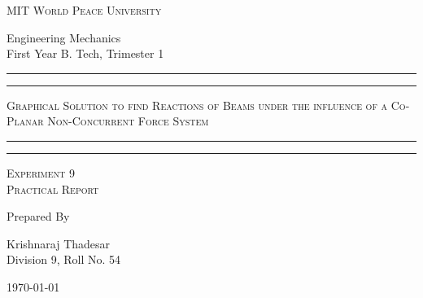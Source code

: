 \documentclass[11pt]{article}
\begin{document}
	
	\begin{titlepage} 
		\centering 
		
		
		\huge\textsc{
			MIT World Peace University
		}\\
	
		\vspace{0.75\baselineskip} %
		
		\LARGE{
			Engineering Mechanics\\
			First Year B. Tech, Trimester 1
		}
	
		
		\vfill %
		
		
		\rule{\textwidth}{1.6pt}\vspace*{-\baselineskip}\vspace*{2pt}
		\rule{\textwidth}{0.6pt}
		\vspace{0.75\baselineskip} %
		
		
		
		\huge{\textsc{
				Graphical Solution to find Reactions of Beams under the influence of a Co-Planar Non-Concurrent Force System
			}} \\
		
		
		
		\vspace{0.5\baselineskip} %
		\rule{\textwidth}{0.6pt}\vspace*{-\baselineskip}\vspace*{2.8pt}
		\rule{\textwidth}{1.6pt}
		
		\vspace{1\baselineskip} %

			
		\LARGE\textsc{
			Experiment 9\\
			Practical Report
		} %
		\vfill
		
		
		Prepared By
		\vspace{0.5\baselineskip} %
		
		\Large{
			Krishnaraj Thadesar \\
			Division 9, Roll No. 54
		}
		
		
		\vspace{0.5\baselineskip} %
		\today

	\end{titlepage}
	
\end{document}
